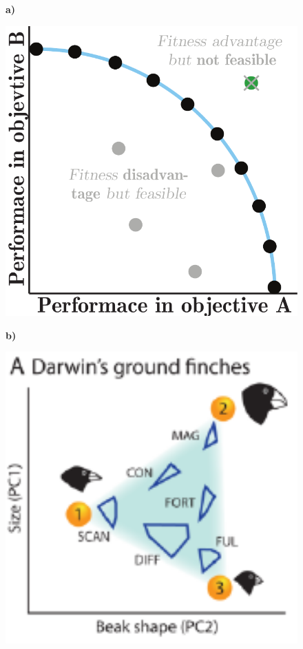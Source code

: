 \begin{figure}[ht]
	\centering
	\textbf{a)}
	\hspace{0.2cm}
	\begin{minipage}[r]{0.4\textwidth}
		\centering
		\includegraphics[width=1\textwidth]{figures/paretoOptimality}
	\end{minipage}
	\hspace{0.7cm}
	\textbf{b)}
	\hspace{0.2cm}
	\begin{minipage}[l]{0.4\textwidth}
		\centering
		\includegraphics[width=1\textwidth]{figures/trade_offs_finch}

\end{minipage}
\end{figure}
